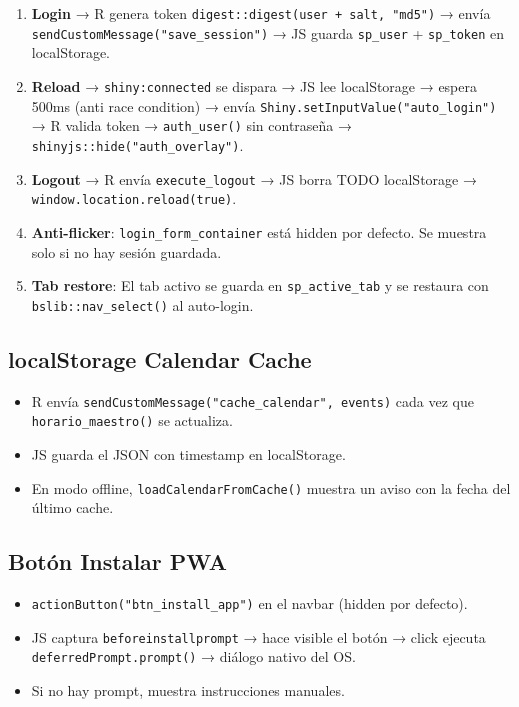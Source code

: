 \documentclass[
  spanish,
  11pt,
  a4paper,
]{article}
\providecommand{\tightlist}{%
  \setlength{\itemsep}{0pt}\setlength{\parskip}{0pt}}
\begin{document}
\begin{enumerate}
\def\labelenumi{\arabic{enumi}.}
\tightlist
\item
  \textbf{Login} → R genera token
  \texttt{digest::digest(user\ +\ salt,\ "md5")} → envía
  \texttt{sendCustomMessage("save\_session")} → JS guarda
  \texttt{sp\_user} + \texttt{sp\_token} en localStorage.
\item
  \textbf{Reload} → \texttt{shiny:connected} se dispara → JS lee
  localStorage → espera 500ms (anti race condition) → envía
  \texttt{Shiny.setInputValue("auto\_login")} → R valida token →
  \texttt{auth\_user()} sin contraseña →
  \texttt{shinyjs::hide("auth\_overlay")}.
\item
  \textbf{Logout} → R envía \texttt{execute\_logout} → JS borra TODO
  localStorage → \texttt{window.location.reload(true)}.
\item
  \textbf{Anti-flicker}: \texttt{login\_form\_container} está hidden por
  defecto. Se muestra solo si no hay sesión guardada.
\item
  \textbf{Tab restore}: El tab activo se guarda en
  \texttt{sp\_active\_tab} y se restaura con
  \texttt{bslib::nav\_select()} al auto-login.
\end{enumerate}

\subsection{localStorage Calendar
Cache}\label{localstorage-calendar-cache}

\begin{itemize}
\tightlist
\item
  R envía \texttt{sendCustomMessage("cache\_calendar",\ events)} cada
  vez que \texttt{horario\_maestro()} se actualiza.
\item
  JS guarda el JSON con timestamp en localStorage.
\item
  En modo offline, \texttt{loadCalendarFromCache()} muestra un aviso con
  la fecha del último cache.
\end{itemize}

\subsection{Botón Instalar PWA}\label{botuxf3n-instalar-pwa}

\begin{itemize}
\tightlist
\item
  \texttt{actionButton("btn\_install\_app")} en el navbar (hidden por
  defecto).
\item
  JS captura \texttt{beforeinstallprompt} → hace visible el botón →
  click ejecuta \texttt{deferredPrompt.prompt()} → diálogo nativo del
  OS.
\item
  Si no hay prompt, muestra instrucciones manuales.
\end{itemize}
\end{document}
